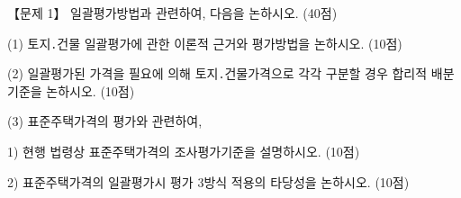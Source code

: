 \begin{longquestion}{【문제 1】}
일괄평가방법과 관련하여, 다음을 논하시오. (40점) \par
\medskip\noindent (1) 토지․건물 일괄평가에 관한 이론적 근거와 평가방법을 논하시오. (10점) \par
\medskip\noindent (2) 일괄평가된 가격을 필요에 의해 토지․건물가격으로 각각 구분할 경우 합리적 배분기준을 논하시오. (10점) \par
\medskip\noindent (3) 표준주택가격의 평가와 관련하여, \par
1) 현행 법령상 표준주택가격의 조사평가기준을 설명하시오. (10점) \par
2) 표준주택가격의 일괄평가시 평가 3방식 적용의 타당성을 논하시오. (10점) \par
\end{longquestion}
